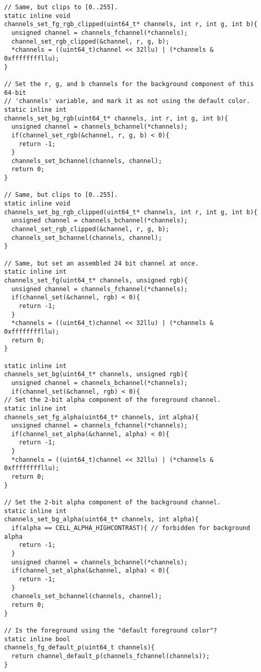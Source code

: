 \begin{listing}[!htb]
\begin{verbatim}
// Same, but clips to [0..255].
static inline void
channels_set_fg_rgb_clipped(uint64_t* channels, int r, int g, int b){
  unsigned channel = channels_fchannel(*channels);
  channel_set_rgb_clipped(&channel, r, g, b);
  *channels = ((uint64_t)channel << 32llu) | (*channels & 0xffffffffllu);
}

// Set the r, g, and b channels for the background component of this 64-bit
// 'channels' variable, and mark it as not using the default color.
static inline int
channels_set_bg_rgb(uint64_t* channels, int r, int g, int b){
  unsigned channel = channels_bchannel(*channels);
  if(channel_set_rgb(&channel, r, g, b) < 0){
    return -1;
  }
  channels_set_bchannel(channels, channel);
  return 0;
}

// Same, but clips to [0..255].
static inline void
channels_set_bg_rgb_clipped(uint64_t* channels, int r, int g, int b){
  unsigned channel = channels_bchannel(*channels);
  channel_set_rgb_clipped(&channel, r, g, b);
  channels_set_bchannel(channels, channel);
}

// Same, but set an assembled 24 bit channel at once.
static inline int
channels_set_fg(uint64_t* channels, unsigned rgb){
  unsigned channel = channels_fchannel(*channels);
  if(channel_set(&channel, rgb) < 0){
    return -1;
  }
  *channels = ((uint64_t)channel << 32llu) | (*channels & 0xffffffffllu);
  return 0;
}

static inline int
channels_set_bg(uint64_t* channels, unsigned rgb){
  unsigned channel = channels_bchannel(*channels);
  if(channel_set(&channel, rgb) < 0){
// Set the 2-bit alpha component of the foreground channel.
static inline int
channels_set_fg_alpha(uint64_t* channels, int alpha){
  unsigned channel = channels_fchannel(*channels);
  if(channel_set_alpha(&channel, alpha) < 0){
    return -1;
  }
  *channels = ((uint64_t)channel << 32llu) | (*channels & 0xffffffffllu);
  return 0;
}

// Set the 2-bit alpha component of the background channel.
static inline int
channels_set_bg_alpha(uint64_t* channels, int alpha){
  if(alpha == CELL_ALPHA_HIGHCONTRAST){ // forbidden for background alpha
    return -1;
  }
  unsigned channel = channels_bchannel(*channels);
  if(channel_set_alpha(&channel, alpha) < 0){
    return -1;
  }
  channels_set_bchannel(channels, channel);
  return 0;
}

// Is the foreground using the "default foreground color"?
static inline bool
channels_fg_default_p(uint64_t channels){
  return channel_default_p(channels_fchannel(channels));
}


\end{verbatim}
\end{listing}

